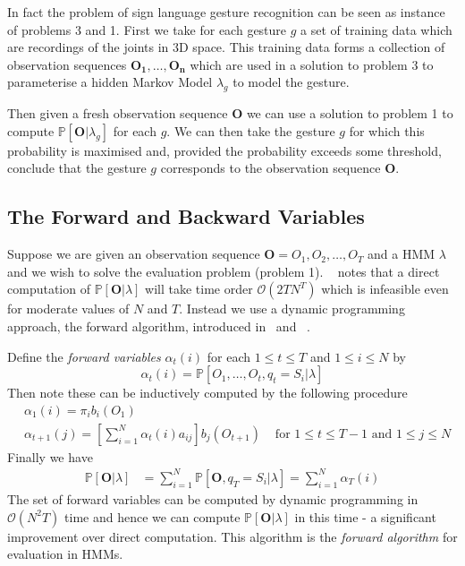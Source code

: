 In fact the problem of sign language gesture recognition can be seen as instance of problems 3 and 1. First we take for each gesture $g$ a set of training data which are recordings of the joints in 3D space. This training data forms a collection of observation sequences $\bm{O_1}, \dots, \bm{O_n}$ which are used in a solution to problem 3 to parameterise a hidden Markov Model $\lambda_g$ to model the gesture.

Then given a fresh observation sequence $\bm{O}$ we can use a solution to problem 1 to compute $\mathbb{P}[\bm{O} | \lambda_g]$ for each $g$. We can then take the gesture $g$ for which this probability is maximised and, provided the probability exceeds some threshold, conclude that the gesture $g$ corresponds to the observation sequence $\bm{O}$. 

\subsection{The Forward and Backward Variables}
Suppose we are given an observation sequence $\bm{O} = O_1,O_2,\dots,O_T$ and a HMM $\lambda$ and we wish to solve the evaluation problem (problem 1). ~\citet{rabiner1989tutorial} notes that a direct computation of $\mathbb{P}[\bm{O}|\lambda]$ will take time order $\mathcal{O}(2TN^T)$ which is infeasible even for moderate values of $N$ and $T$. Instead we use a dynamic programming approach, the forward algorithm, introduced in~\citet{baum1968growth} and ~\cite{baum1970maximization}.

Define the \emph{forward variables} $\alpha_t(i)$ for each $1\leq t \leq T$ and $1 \leq i \leq N$ by
\begin{equation*}
\alpha_t(i) = \mathbb{P}[O_1, \dots, O_t, q_t=S_i | \lambda]
\end{equation*}
Then note these can be inductively computed by the following procedure 
\begin{align*}
&\alpha_1(i) = \pi_ib_i(O_1)\\
&\alpha_{t+1}(j) = \left[ \sum_{i=1}^{N} \alpha_{t}(i)a_{ij} \right]b_j(O_{t+1}) &\text{ for $1\leq t \leq T-1$ and $1 \leq j \leq N$}
\end{align*}
Finally we have
\begin{align*}
\mathbb{P}[\bm{O} | \lambda] &= \sum_{i=1}^N \mathbb{P}[\bm{O}, q_T = S_i | \lambda] = \sum_{i=1}^N \alpha_T(i)
\end{align*}
The set of forward variables can be computed by dynamic programming in $\mathcal{O}(N^2T)$ time and hence we can compute $\mathbb{P}[\bm{O} | \lambda]$ in this time -  a significant improvement over direct computation. This algorithm is the \emph{forward algorithm} for evaluation in HMMs. 

